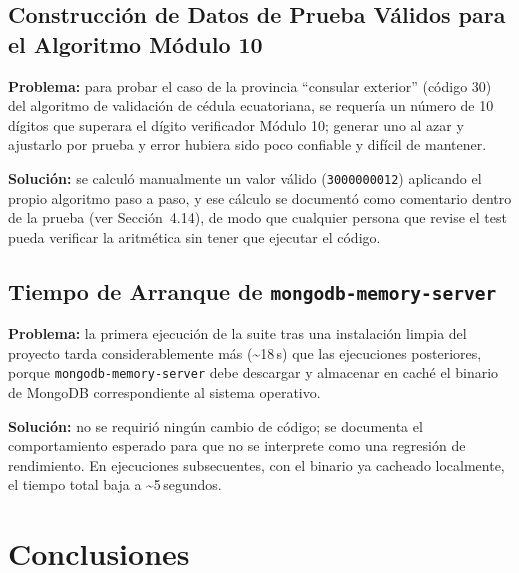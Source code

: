 \documentclass[12pt,a4paper]{article}
\begin{document}
\subsection{Construcción de Datos de Prueba Válidos para el Algoritmo Módulo 10}

\textbf{Problema:} para probar el caso de la provincia ``consular exterior'' (código 30)
del algoritmo de validación de cédula ecuatoriana, se requería un número de 10 dígitos que
superara el dígito verificador Módulo 10; generar uno al azar y ajustarlo por prueba y
error hubiera sido poco confiable y difícil de mantener.

\textbf{Solución:} se calculó manualmente un valor válido (\texttt{3000000012})
aplicando el propio algoritmo paso a paso, y ese cálculo se documentó como comentario
dentro de la prueba (ver Sección~4.14), de modo que cualquier persona que revise el test
pueda verificar la aritmética sin tener que ejecutar el código.

\subsection{Tiempo de Arranque de \texttt{mongodb-memory-server}}

\textbf{Problema:} la primera ejecución de la suite tras una instalación limpia del
proyecto tarda considerablemente más (\textasciitilde 18\,s) que las ejecuciones
posteriores, porque \texttt{mongodb-memory-server} debe descargar y almacenar en caché el
binario de MongoDB correspondiente al sistema operativo.

\textbf{Solución:} no se requirió ningún cambio de código; se documenta el comportamiento
esperado para que no se interprete como una regresión de rendimiento. En ejecuciones
subsecuentes, con el binario ya cacheado localmente, el tiempo total baja a
\textasciitilde 5\,segundos.

\clearpage

\section{Conclusiones}
\end{document}
